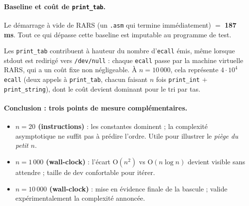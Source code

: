 \documentclass[11pt,a4paper]{article}
\begin{document}
\paragraph{Baseline et coût de \texttt{print\_tab}.}

Le démarrage \guillemotleft{} à vide \guillemotright{} de RARS (un
\texttt{.asm} qui termine immédiatement) $=$ \textbf{187 ms}. Tout ce
qui dépasse cette baseline est imputable au programme de test.

Les \texttt{print\_tab} contribuent à hauteur du nombre d'\texttt{ecall}
émis, même lorsque stdout est redirigé vers \texttt{/dev/null} : chaque
\texttt{ecall} passe par la machine virtuelle RARS, qui a un coût fixe
non négligeable. À $n = 10\,000$, cela représente $4 \cdot 10^4$
\texttt{ecall} (deux appels à \texttt{print\_tab}, chacun faisant
$n$ fois \texttt{print\_int} $+$ \texttt{print\_string}), dont le coût
devient dominant pour le tri par tas.

\paragraph{Conclusion : trois points de mesure complémentaires.}

\begin{itemize}
    \item \textbf{$n = 20$ (instructions)} : les constantes dominent ;
          la complexité asymptotique ne suffit pas à prédire l'ordre.
          Utile pour illustrer le \emph{piège du petit $n$}.
    \item \textbf{$n = 1\,000$ (wall-clock)} : l'écart O$(n^2)$ vs
          O$(n \log n)$ devient visible sans attendre ; taille de dev
          confortable pour itérer.
    \item \textbf{$n = 10\,000$ (wall-clock)} : mise en évidence finale
          de la bascule ; valide expérimentalement la complexité
          annoncée.
\end{itemize}
\end{document}
